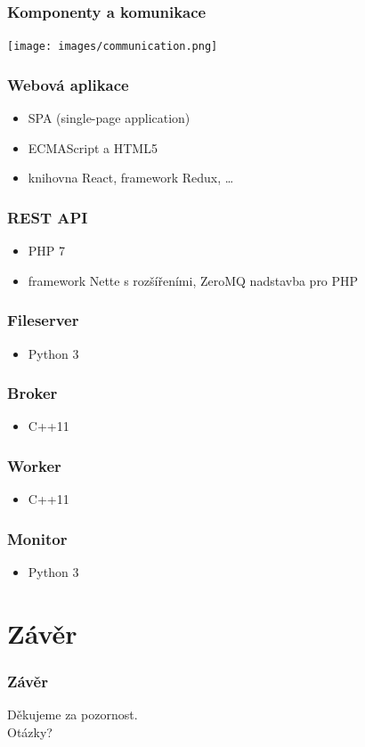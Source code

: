 \documentclass{beamer}
\begin{document}
\begin{frame}
	\frametitle{Komponenty a komunikace}
	\begin{center}
		\texttt{[image: images/communication.png]}
	\end{center}
\end{frame}

\begin{frame}
	\frametitle{Webová aplikace}
	\begin{itemize}
		\item SPA (single-page application)
		\item ECMAScript a HTML5
		\item knihovna React, framework Redux, \dots
	\end{itemize}
\end{frame}

\begin{frame}
	\frametitle{REST API}
	\begin{itemize}
		\item PHP 7
		\item framework Nette s rozšířeními, ZeroMQ nadstavba pro PHP
	\end{itemize}
\end{frame}

\begin{frame}
	\frametitle{Fileserver}
	\begin{itemize}
		\item Python 3
	\end{itemize}
\end{frame}

\begin{frame}
	\frametitle{Broker}
	\begin{itemize}
		\item C++11
	\end{itemize}
\end{frame}

\begin{frame}
	\frametitle{Worker}
	\begin{itemize}
		\item C++11
	\end{itemize}
\end{frame}

\begin{frame}
	\frametitle{Monitor}
	\begin{itemize}
		\item Python 3
	\end{itemize}
\end{frame}

\section{Závěr}
\begin{frame}
	\frametitle{Závěr}
	\centering
	Děkujeme za pozornost.\\
	\LARGE{Otázky?}
\end{frame}
\end{document}
